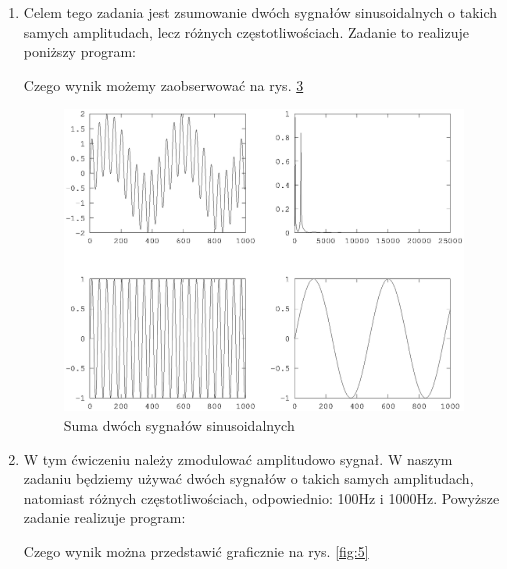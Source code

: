 \documentclass[11pt,a4paper]{article}
\begin{document}
\begin{enumerate}
\begin{figure}
\caption{Sygnał sinusoidalny i jego transformata - 100 próbek}
\label{fig:a2}
\end{figure}
Natomiast dla 100000 próbek otrzymujemy rys. \ref{fig:a3}
\begin{figure}
\centering
\texttt{[image: proba1\_3\_dom]}
\caption{Sygnał sinusoidalny i jego transformata - 100000 próbek}
\label{fig:a3}
\end{figure}
\newpage
\item Celem tego zadania jest zsumowanie dwóch sygnałów sinusoidalnych o takich samych amplitudach, lecz różnych częstotliwościach. Zadanie to realizuje poniższy program:

Czego wynik możemy zaobserwować na rys. \ref{fig:4}
\begin{figure}
\includegraphics[scale=0.8]{proba2_dom}
\caption{Suma dwóch sygnałów sinusoidalnych}
\label{fig:4}
\end{figure}
\newpage
\item W tym ćwiczeniu należy zmodulować amplitudowo sygnał. W naszym zadaniu będziemy używać dwóch sygnałów o takich samych amplitudach, natomiast różnych częstotliwościach, odpowiednio: 100Hz i 1000Hz. Powyższe zadanie realizuje program:

Czego wynik można przedstawić graficznie na rys. \ref{fig:5}
\begin{figure}

\end{figure}
\end{enumerate}
\end{document}
